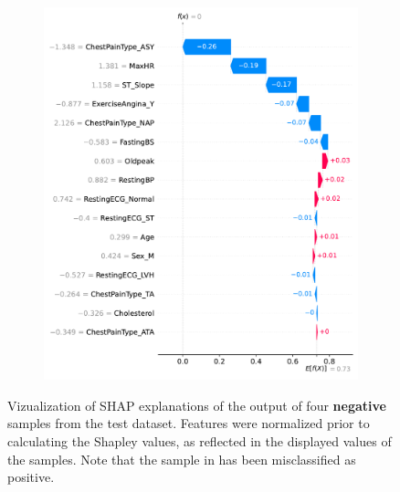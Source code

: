 \begin{figure}
\begin{subfigure}{1\columnwidth}
        \includegraphics[width=1\textwidth]{images/shap_sample_negative_4.pdf}
        \caption{}
    \end{subfigure}
    \caption{Vizualization of SHAP explanations of the output of four \textbf{negative} samples from the test dataset. Features were normalized prior to calculating the Shapley values, as reflected in the displayed values of the samples. Note that the sample in \protect{} has been misclassified as positive.}
    \label{fig:shap_sample_negative}
\end{figure}
